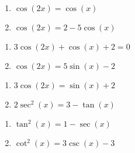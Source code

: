\begin{multicols}{2}

\begin{enumerate}

\setcounter{enumi}{\value{HW}}

\item $\cos \left( 2x \right) = \cos \left( x \right)$
\item  $\cos(2x) = 2 - 5\cos(x)$

\setcounter{HW}{\value{enumi}}

\end{enumerate}

\end{multicols}

\begin{multicols}{2}

\begin{enumerate}

\setcounter{enumi}{\value{HW}}

\item  $3\cos(2x) + \cos(x) + 2 = 0$
\item  $\cos(2x) = 5\sin(x) - 2$

\setcounter{HW}{\value{enumi}}

\end{enumerate}

\end{multicols}

\begin{multicols}{2}

\begin{enumerate}

\setcounter{enumi}{\value{HW}}

\item  $3\cos(2x) = \sin(x) + 2$
\item  $2\sec^{2}(x) = 3 - \tan(x)$

\setcounter{HW}{\value{enumi}}

\end{enumerate}

\end{multicols}

\begin{multicols}{2}

\begin{enumerate}

\setcounter{enumi}{\value{HW}}

\item  $\tan^{2}(x) = 1-\sec(x)$
\item  $\cot^{2}(x) = 3\csc(x) - 3$

\setcounter{HW}{\value{enumi}}

\end{enumerate}

\end{multicols}

